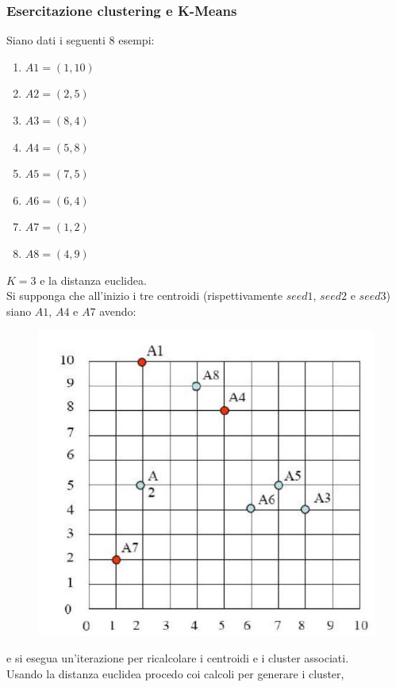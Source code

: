 \documentclass[a4paper,12pt, oneside]{book}
\begin{document}
\subsubsection{Esercitazione clustering e K-Means}
\begin{esercizio}
  Siano dati i seguenti 8 esempi:
  \begin{enumerate}
    \item $A1=(1,10)$
    \item $A2=(2,5)$
    \item $A3=(8,4)$
    \item $A4=(5,8)$
    \item $A5=(7,5)$
    \item $A6=(6,4)$
    \item $A7=(1,2)$
    \item $A8=(4,9)$
  \end{enumerate}
  $K=3$ e la distanza euclidea.\\
  Si supponga che all'inizio i tre centroidi (rispettivamente $seed1$, $seed2$ e
  $seed$3) siano $A1$, $A4$ e $A7$ avendo: 
  \begin{figure}[H]
    \centering
    \includegraphics[scale = 0.4]{img/clue.jpg}
  \end{figure}
  \noindent
  e si esegua un'iterazione per ricalcolare i centroidi e i cluster associati.\\
  Usando la distanza euclidea procedo coi calcoli per generare i cluster,

\end{esercizio}
\end{document}
